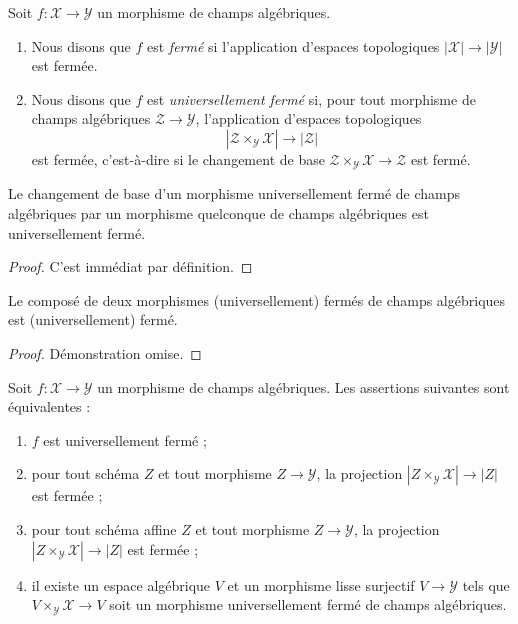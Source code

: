 \begin{definition}
\label{definition-closed}
Soit $f : \mathcal{X} \to \mathcal{Y}$ un morphisme de champs algébriques.
\begin{enumerate}
\item Nous disons que $f$ est {\it fermé} si l'application d'espaces
topologiques $|\mathcal{X}| \to |\mathcal{Y}|$ est fermée.
\item Nous disons que $f$ est {\it universellement fermé} si, pour tout
morphisme de champs algébriques $\mathcal{Z} \to \mathcal{Y}$,
l'application d'espaces topologiques
$$
|\mathcal{Z} \times_\mathcal{Y} \mathcal{X}| \to |\mathcal{Z}|
$$
est fermée, c'est-à-dire si le changement de base
$\mathcal{Z} \times_\mathcal{Y} \mathcal{X} \to \mathcal{Z}$ est fermé.
\end{enumerate}
\end{definition}

\begin{lemma}
\label{lemma-base-change-universally-closed}
Le changement de base d'un morphisme universellement fermé de champs
algébriques par un morphisme quelconque de champs algébriques est
universellement fermé.
\end{lemma}

\begin{proof}
C'est immédiat par définition.
\end{proof}

\begin{lemma}
\label{lemma-composition-universally-closed}
Le composé de deux morphismes (universellement) fermés de champs
algébriques est (universellement) fermé.
\end{lemma}

\begin{proof}
Démonstration omise.
\end{proof}

\begin{lemma}
\label{lemma-universally-closed-local}
Soit $f : \mathcal{X} \to \mathcal{Y}$ un morphisme de champs algébriques.
Les assertions suivantes sont équivalentes :
\begin{enumerate}
\item $f$ est universellement fermé ;
\item pour tout schéma $Z$ et tout morphisme $Z \to \mathcal{Y}$,
la projection $|Z \times_\mathcal{Y} \mathcal{X}| \to |Z|$
est fermée ;
\item pour tout schéma affine $Z$ et tout morphisme $Z \to \mathcal{Y}$,
la projection $|Z \times_\mathcal{Y} \mathcal{X}| \to |Z|$
est fermée ;
\item il existe un espace algébrique $V$ et un morphisme lisse surjectif
$V \to \mathcal{Y}$ tels que $V \times_\mathcal{Y} \mathcal{X} \to V$
soit un morphisme universellement fermé de champs algébriques.
\end{enumerate}
\end{lemma}

